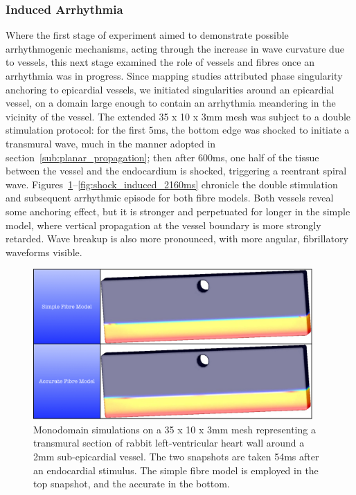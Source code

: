   \subsubsection{Induced Arrhythmia} %
  \label{sub:induced_arrhythmia}
    Where the first stage of experiment aimed to demonstrate possible arrhythmogenic mechanisms, acting through the increase in wave curvature due to vessels, this next stage examined the role of vessels and fibres once an arrhythmia was in progress. Since mapping studies \cite{Valderrabano2003,Cysyk2008,Qin2005} attributed phase singularity anchoring to epicardial vessels, we initiated singularities around an epicardial vessel, on a domain large enough to contain an arrhythmia meandering in the vicinity of the vessel. The extended 35 x 10 x 3mm mesh was subject to a double stimulation protocol: for the first 5ms, the bottom edge was shocked to initiate a transmural wave, much in the manner adopted in section~\ref{sub:planar_propagation}; then after 600ms, one half of the tissue between the vessel and the endocardium is shocked, triggering a reentrant spiral wave. Figures~\ref{fig:shock_induced_54ms}--\ref{fig:shock_induced_2160ms} chronicle the double stimulation and subsequent arrhythmic episode for both fibre models. Both vessels reveal some anchoring effect, but it is stronger and perpetuated for longer in the simple model, where vertical propagation at the vessel boundary is more strongly retarded. Wave breakup is also more pronounced, with more angular, fibrillatory waveforms visible.
  	
    \begin{figure}[htbp]
  		\centering
  	    \includegraphics[width=0.95\textwidth]{Ch5/Figs/shock_induced_54ms}
              \caption{Monodomain simulations on a 35 x 10 x 3mm mesh representing a transmural section of rabbit left-ventricular heart wall around a 2mm sub-epicardial vessel. The two snapshots are taken 54ms after an endocardial stimulus. The simple fibre model is employed in the top snapshot, and the accurate in the bottom.}
  	  \label{fig:shock_induced_54ms}
  	\end{figure}
  	
